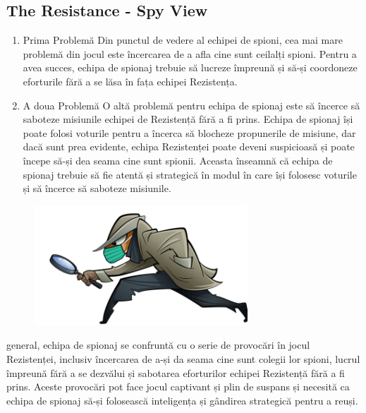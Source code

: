 \pagebreak
\subsection{The Resistance - Spy View}

\begin{enumerate}
    \item Prima Problemă\newline\newline
Din punctul de vedere al echipei de spioni, cea mai mare problemă din jocul este încercarea de a afla cine sunt ceilalți spioni. Pentru a avea succes, echipa de spionaj trebuie să lucreze împreună și să-și coordoneze eforturile fără a se lăsa în fața echipei Rezistența.\newline
    \item A doua Problemă\newline\newline
O altă problemă pentru echipa de spionaj este să încerce să saboteze misiunile echipei de Rezistență fără a fi prins. Echipa de spionaj își poate folosi voturile pentru a încerca să blocheze propunerile de misiune, dar dacă sunt prea evidente, echipa Rezistenței poate deveni suspicioasă și poate începe să-și dea seama cine sunt spionii. Aceasta înseamnă că echipa de spionaj trebuie să fie atentă și strategică în modul în care își folosesc voturile și să încerce să saboteze misiunile. \newline

\end{enumerate}

\begin{figure}[h]
    \centering
    \includegraphics[width=8cm]{text/images/pic4.png}\\
\end{figure} \newline\newline

\newline{} general, echipa de spionaj se confruntă cu o serie de provocări în jocul Rezistenței, inclusiv încercarea de a-și da seama cine sunt colegii lor spioni, lucrul împreună fără a se dezvălui și sabotarea eforturilor echipei Rezistență fără a fi prins. Aceste provocări pot face jocul captivant și plin de suspans și necesită ca echipa de spionaj să-și folosească inteligența și gândirea strategică pentru a reuși.

\pagebreak
